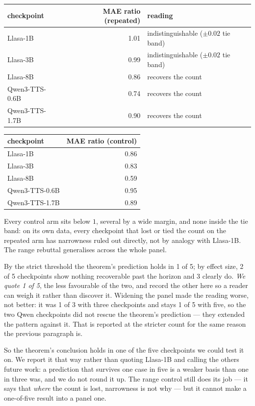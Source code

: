 \documentclass[11pt]{article}
\begin{document}
\begin{center}
\begin{tabular}{lrl}
\toprule
checkpoint & MAE ratio (repeated) & reading \\
\midrule
Llasa-1B       & 1.01 & indistinguishable ($\pm0.02$ tie band) \\
Llasa-3B       & 0.99 & indistinguishable ($\pm0.02$ tie band) \\
Llasa-8B       & 0.86 & recovers the count \\
Qwen3-TTS-0.6B & 0.74 & recovers the count \\
Qwen3-TTS-1.7B & 0.90 & recovers the count \\
\bottomrule
\end{tabular}
\begin{tabular}{lr}
\toprule
checkpoint & MAE ratio (control) \\
\midrule
Llasa-1B       & 0.86 \\
Llasa-3B       & 0.83 \\
Llasa-8B       & 0.59 \\
Qwen3-TTS-0.6B & 0.95 \\
Qwen3-TTS-1.7B & 0.89 \\
\bottomrule
\end{tabular}
\end{center}

\noindent Every control arm sits below $1$, several by a wide margin, and none
inside the tie band: on its own data, every checkpoint that lost or tied the
count on the repeated arm has narrowness ruled out directly, not by analogy with
Llasa-1B. The range rebuttal generalises across the whole panel.

\noindent By the strict threshold the theorem's prediction holds in 1 of 5; by
effect size, 2 of 5 checkpoints show nothing recoverable past the horizon and 3
clearly do. \emph{We quote 1 of 5}, the less favourable of the two, and record
the other here so a reader can weigh it rather than discover it. Widening the
panel made the reading worse, not better: it was 1 of 3 with three checkpoints
and stays 1 of 5 with five, so the two Qwen checkpoints did not rescue the
theorem's prediction --- they extended the pattern against it. That is reported
at the stricter count for the same reason the previous paragraph is.

So the theorem's conclusion holds in one of the five checkpoints we could test it
on. We report it that way rather than quoting Llasa-1B and calling the others
future work: a prediction that survives one case in five is a weaker basis than
one in three was, and we do not round it up. The range control still does its
job --- it says that \emph{where} the count is lost, narrowness is not why --- but
it cannot make a one-of-five result into a panel one.
\end{document}
